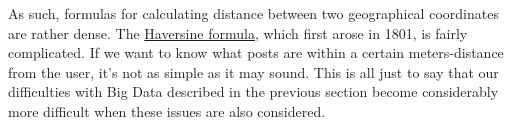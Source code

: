 \documentclass[draftclsnofoot, onecolumn, letterpaper,10pt,compsoc]{IEEEtran}
\begin{document}
As such, formulas for calculating distance between two geographical coordinates are rather dense. The \href{https://en.wikipedia.org/wiki/Haversine_formula}{Haversine formula}, which first arose in 1801, is fairly complicated. If we want to know what posts are within a certain meters-distance from the user, it's not as simple as it may sound.  This is all just to say that our difficulties with Big Data described in the previous section become considerably more difficult when these issues are also considered. 


\end{document}
